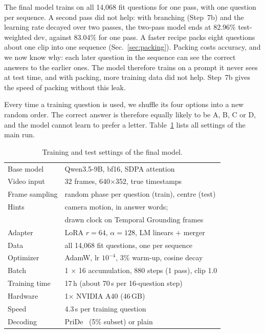 The final model trains on all 14,068 fit questions for one pass, with one
question per sequence. A second pass did not help: with branching
(Step~7b) and the learning rate decayed over two passes, the two-pass model
ends at 82.96\% test-weighted dev, against 83.04\% for one pass. A faster recipe packs eight questions about one clip
into one sequence (Sec.~\ref{sec:packing}). Packing costs accuracy, and we
now know why: each later question in the sequence can see the correct
answers to the earlier ones. The model therefore trains on a prompt it never
sees at test time, and with packing, more training data did not help.
Step~7b gives the speed of packing without this leak.

Every time a training question is used, we shuffle its four options into a
new random order. The correct answer is therefore equally likely to be A,
B, C or D, and the model cannot learn to prefer a letter.
Table~\ref{tab:setup} lists all settings of the main run.

\begin{table}[t]
\centering
\caption{Training and test settings of the final model.}
\label{tab:setup}
\footnotesize
\begin{tabular}{@{}ll@{}}
\toprule
Base model & Qwen3.5-9B, bf16, SDPA attention \\
Video input & 32 frames, 640$\times$352, true timestamps \\
Frame sampling & random phase per question (train), centre (test) \\
Hints & camera motion, in answer words; \\
 & drawn clock on Temporal Grounding frames \\
Adapter & LoRA $r{=}64$, $\alpha{=}128$, LM linears + merger \\
Data & all 14,068 fit questions, one per sequence \\
Optimizer & AdamW, lr $10^{-4}$, 3\% warm-up, cosine decay \\
Batch & 1 $\times$ 16 accumulation, 880 steps (1 pass), clip 1.0 \\
Training time & 17\,h (about 70\,s per 16-question step) \\
Hardware & 1$\times$ NVIDIA A40 (46\,GB) \\
Speed & 4.3\,s per training question \\
Decoding & PriDe~\cite{zheng2024pride} (5\% subset) or plain \\
\bottomrule
\end{tabular}
\end{table}

